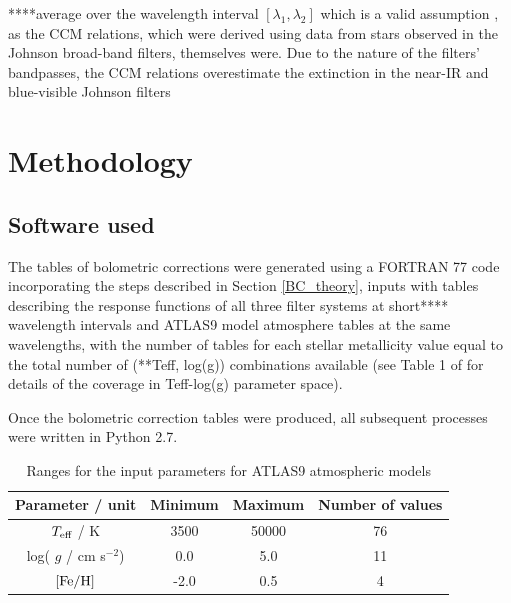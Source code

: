 \documentclass[12pt, a4paper]{report}
\begin{document}
****average over the wavelength interval $[\lambda_{1},\lambda_{2}]$ which is a valid assumption \citep{2014MNRAS.444..392C}, as the CCM relations, which were derived using data from stars observed in the Johnson broad-band filters, themselves were. Due to the nature of the filters' bandpasses, the CCM relations overestimate the extinction in the near-IR and blue-visible Johnson filters

\chapter{Methodology}
\section{Software used}
The tables of bolometric corrections were generated using a FORTRAN 77 code incorporating the steps described in Section \ref{BC_theory}, inputs with tables describing the response functions of all three filter systems at short**** wavelength intervals and ATLAS9 model atmosphere tables at the same wavelengths, with the number of tables for each stellar metallicity value equal to the total number of (**Teff, log(g)) combinations available (see Table 1 of \cite{2004astro.ph..5087C} for details of the coverage in Teff-log(g) parameter space).

Once the bolometric correction tables were produced, all subsequent processes were written in Python 2.7.

\begin{table}
\begin{center}
\begin{tabular}{cccc}
\hline
Parameter / unit & Minimum & Maximum & Number of values \\
\hline
$T_{\textnormal{eff}}$ / K & 3500 & 50000 & 76 \\
log( $g$ / cm s$^{-2}$) & 0.0 & 5.0 & 11 \\
$\textnormal{[Fe/H]}$ & -2.0 & 0.5 & 4 \\
\hline
\end{tabular}
\caption{Ranges for the input parameters for ATLAS9 atmospheric models}
\label{atlas9_input}
\end{center}
\end{table}
\end{document}
